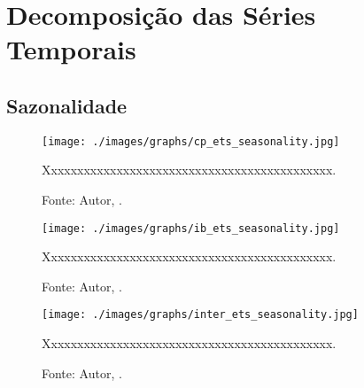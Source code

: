

\chapter{Decomposição das Séries Temporais}

\section{Sazonalidade}





\begin{figure}[H]
    \centering
    \texttt{[image: ./images/graphs/cp\_ets\_seasonality.jpg]}
    \caption{Xxxxxxxxxxxxxxxxxxxxxxxxxxxxxxxxxxxxxxxxxxxx.}
    \label{fig:cp_ets_seasonality.jpg}
    \caption*{Fonte: Autor, \imprimirdata.}
\end{figure}




\begin{figure}[H]
    \centering
    \texttt{[image: ./images/graphs/ib\_ets\_seasonality.jpg]}
    \caption{Xxxxxxxxxxxxxxxxxxxxxxxxxxxxxxxxxxxxxxxxxxxx.}
    \label{fig:ib_ets_seasonality.jpg}
    \caption*{Fonte: Autor, \imprimirdata.}
\end{figure}




\begin{figure}[H]
    \centering
    \texttt{[image: ./images/graphs/inter\_ets\_seasonality.jpg]}
    \caption{Xxxxxxxxxxxxxxxxxxxxxxxxxxxxxxxxxxxxxxxxxxxx.}
    \label{fig:inter_ets_seasonality.jpg}
    \caption*{Fonte: Autor, \imprimirdata.}
\end{figure}

